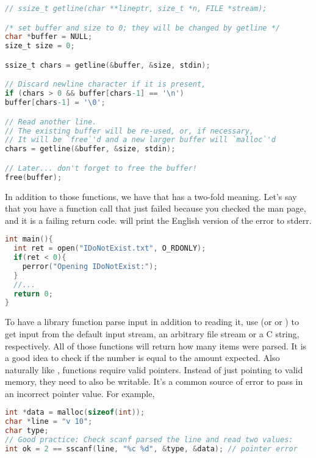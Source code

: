\begin{lstlisting}[language=C]
// ssize_t getline(char **lineptr, size_t *n, FILE *stream);

/* set buffer and size to 0; they will be changed by getline */
char *buffer = NULL;
size_t size = 0;

ssize_t chars = getline(&buffer, &size, stdin);

// Discard newline character if it is present,
if (chars > 0 && buffer[chars-1] == '\n')
buffer[chars-1] = '\0';

// Read another line.
// The existing buffer will be re-used, or, if necessary,
// It will be `free`'d and a new larger buffer will `malloc`'d
chars = getline(&buffer, &size, stdin);

// Later... don't forget to free the buffer!
free(buffer);
\end{lstlisting}

In addition to those functions, we have  that has a two-fold meaning.
Let's say that you have a function call that just failed because you checked the man page, and it is a failing return code.
 will print the English version of the error to stderr.

\begin{lstlisting}[language=C]
int main(){
  int ret = open("IDoNotExist.txt", O_RDONLY);
  if(ret < 0){
    perror("Opening IDoNotExist:");
  }
  //...
  return 0;
}
\end{lstlisting}

To have a library function parse input in addition to reading it, use  (or  or ) to get input from the default input stream, an arbitrary file stream or a C string, respectively.
All of those functions will return how many items were parsed.
It is a good idea to check if the number is equal to the amount expected.
Also naturally like ,  functions require valid pointers.
Instead of just pointing to valid memory, they need to also be writable.
It's a common source of error to pass in an incorrect pointer value.
For example,

\begin{lstlisting}[language=C]
int *data = malloc(sizeof(int));
char *line = "v 10";
char type;
// Good practice: Check scanf parsed the line and read two values:
int ok = 2 == sscanf(line, "%c %d", &type, &data); // pointer error
\end{lstlisting}

